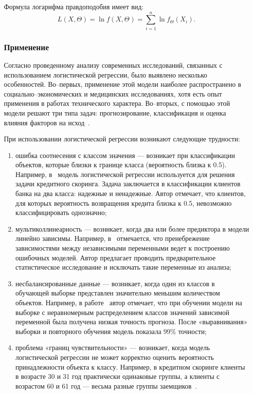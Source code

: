 Формула логарифма правдоподобия имеет вид:
\begin{equation}
    L(X, \Theta) = \ln f(X, \Theta) = \sum_{i=1}^{n} \ln f_{\Theta}(X_i).
\end{equation}

\subsubsection*{Применение}

Согласно проведенному анализу современных исследований, связанных с использованием логистической регрессии, было выявлено несколько особенностей.
Во--первых, применение этой модели наиболее распространено в социально--экономических и медицинских исследованиях, хотя есть опыт применения в работах технического характера.
Во--вторых, с помощью этой модели решают три типа задач: прогнозирование, классификация и оценка влияния факторов на исход~\cite{vlasenko}.

При использовании логистической регрессии возникают следующие трудности:
\begin{enumerate}[label=\arabic*), leftmargin=1.6\parindent]
    \item ошибка соотнесения с классом значения --- возникает при классификации объектов, которые близки к границе класса (вероятность близка к 0.5).
    Например, в~\cite{simov} модель логистической регрессии используется для решения задачи кредитного скоринга.
    Задача заключается в классификации клиентов банка на два класса: надежные и ненадежные.
    Автор отмечает, что клиентов, для которых вероятность возвращения кредита близка к 0.5, невозможно классифицировать однозначно;
    \item мультиколлинеарность --- возникает, когда два или более предиктора в модели линейно зависимы.
    Например, в~\cite{muradov} отмечается, что пренебрежение зависимостями между независимыми переменными ведет к построению ошибочных моделей.
    Автор предлагает проводить предварительное статистическое исследование и исключать такие переменные из анализа;
    \item несбалансированные данные --- возникает, когда один из классов в обучающей выборке представлен значительно меньшим количеством объектов.
    Например, в работе~\cite{seredniy} автор отмечает, что при обучении модели на выборке с неравномерным распределением классов значений зависимой переменной была получена низкая точность прогноза.
    После «выравнивания» выборки и повторного обучения модель показала 99\% точности;
    \item проблема «границ чувствительности» --- возникает, когда модель логистической регрессии не может корректно оценить вероятность принадлежности объекта к классу.
    Например, в кредитном скоринге клиенты в возрасте 30 и 31 год практически одинаковые группы, а клиенты с возрастом 60 и 61 год --- весьма разные группы заемщиков~\cite{saponov}.
\end{enumerate}

